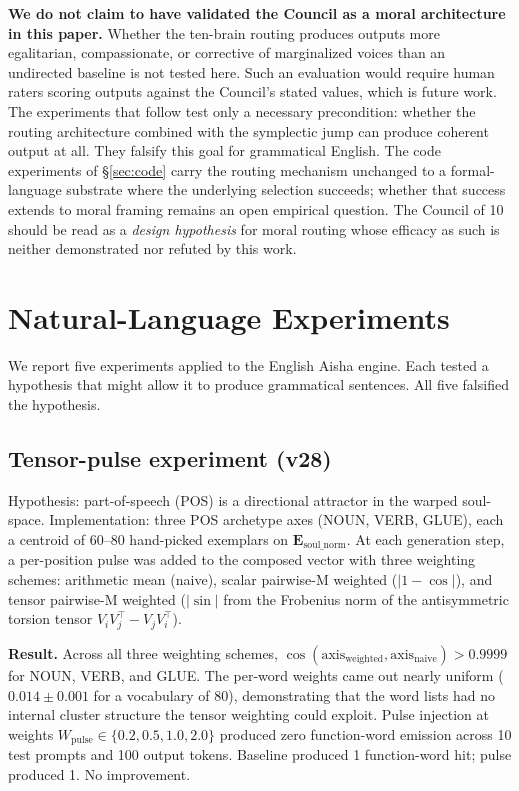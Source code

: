 \documentclass[11pt,a4paper]{article}
\begin{document}
\textbf{We do not claim to have validated the Council as a moral architecture in this paper.} Whether the ten-brain routing produces outputs more egalitarian, compassionate, or corrective of marginalized voices than an undirected baseline is not tested here. Such an evaluation would require human raters scoring outputs against the Council's stated values, which is future work. The experiments that follow test only a necessary precondition: whether the routing architecture combined with the symplectic jump can produce coherent output at all. They falsify this goal for grammatical English. The code experiments of §\ref{sec:code} carry the routing mechanism unchanged to a formal-language substrate where the underlying selection succeeds; whether that success extends to moral framing remains an open empirical question. The Council of 10 should be read as a \emph{design hypothesis} for moral routing whose efficacy as such is neither demonstrated nor refuted by this work.

\section{Natural-Language Experiments}\label{sec:nl}

We report five experiments applied to the English Aisha engine. Each tested a hypothesis that might allow it to produce grammatical sentences. All five falsified the hypothesis.

\subsection{Tensor-pulse experiment (v28)}
Hypothesis: part-of-speech (POS) is a directional attractor in the warped soul-space. Implementation: three POS archetype axes (NOUN, VERB, GLUE), each a centroid of 60--80 hand-picked exemplars on $\mathbf{E}_{\text{soul\_norm}}$. At each generation step, a per-position pulse was added to the composed vector with three weighting schemes: arithmetic mean (naive), scalar pairwise-M weighted ($|1 - \cos|$), and tensor pairwise-M weighted ($|\sin|$ from the Frobenius norm of the antisymmetric torsion tensor $V_i V_j^\top - V_j V_i^\top$).

\textbf{Result.} Across all three weighting schemes, $\cos(\text{axis}_{\text{weighted}}, \text{axis}_{\text{naive}}) > 0.9999$ for NOUN, VERB, and GLUE. The per-word weights came out nearly uniform ($0.014 \pm 0.001$ for a vocabulary of 80), demonstrating that the word lists had no internal cluster structure the tensor weighting could exploit. Pulse injection at weights $W_{\text{pulse}} \in \{0.2, 0.5, 1.0, 2.0\}$ produced zero function-word emission across 10 test prompts and 100 output tokens. Baseline produced 1 function-word hit; pulse produced 1. No improvement.
\end{document}
